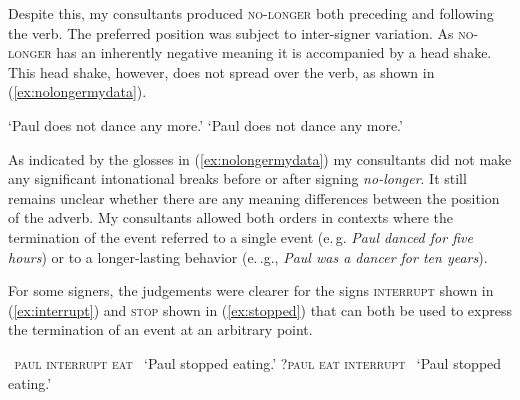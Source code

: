 \noindent Despite this, my consultants produced \textsc{no-longer} both preceding and following the verb. The preferred position was subject to inter-signer variation. As \textsc{no-longer} has an inherently negative meaning it is accompanied by a head shake. This head shake, however, does not spread over the verb, as shown in (\ref{ex:nolongermydata}).

%
\begin{exe}
\ex\label{ex:nolongermydata}\begin{xlist} 
\ex {}  
\glt `Paul does not dance any more.' \label{ex:nolongermydataa}
\ex {} 
\glt `Paul does not dance any more.' \label{ex:nolongermydataa}
\end{xlist}
\end{exe}

\noindent As indicated by the glosses in (\ref{ex:nolongermydata}) my consultants did not make any significant intonational breaks before or after signing \textit{no-longer}. It still remains unclear whether there are any meaning differences between the position of the adverb. My consultants allowed both orders in contexts where the termination of the event referred to a single event (e.\,g. \textit{Paul danced for five hours}) or to a longer-lasting behavior (e.\,.g., \textit{Paul was a dancer for ten years}). 

For some signers, the judgements were clearer for the signs \textsc{interrupt} shown in (\ref{ex:interrupt}) and \textsc{stop} shown in (\ref{ex:stopped}) that can both be used to express the termination of an event at an arbitrary point. 

\begin{exe}
\ex\label{ex:interrupt}\begin{xlist} 
\ex
{\textcolor{white}{?}\textsc{paul interrupt eat}}      
\glt \textcolor{white}{?}`Paul stopped eating.' \label{ex:interrupta}
\ex
{?\textsc{paul eat interrupt}}       
\glt \textcolor{white}{?}`Paul stopped eating.' \label{ex:interruptb}
\end{xlist}
\end{exe}

